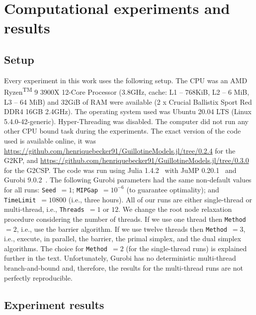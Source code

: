 \documentclass[9pt]{entcs}
\begin{document}
\section{Computational experiments and results}

\subsection{Setup}
\label{sec:setup}

Every experiment in this work uses the following setup.
The CPU was an AMD\textsuperscript{\textregistered} Ryzen\textsuperscript{TM} 9 3900X 12-Core Processor (3.8GHz, cache: L1 -- 768KiB, L2 -- 6 MiB, L3 -- 64 MiB) and 32GiB of RAM were available (2 x Crucial Ballistix Sport Red DDR4 16GB 2.4GHz).
The operating system used was Ubuntu 20.04 LTS (Linux 5.4.0-42-generic).
Hyper-Threading was disabled.
The computer did not run any other CPU bound task during the experiments.
The exact version of the code used is available online, it was \url{https://github.com/henriquebecker91/GuillotineModels.jl/tree/0.2.4} for the G2KP, and \url{https://github.com/henriquebecker91/GuillotineModels.jl/tree/0.3.0} for the G2CSP.
The code was run using Julia 1.4.2~\cite{julia} with JuMP 0.20.1~\cite{JuMP} and Gurobi 9.0.2~\cite{gurobi}.
The following Gurobi parameters had the same non-default values for all runs: \verb+Seed+~\(= 1\); \verb+MIPGap+~\(= 10^{-6}\) (to guarantee optimality); and \verb+TimeLimit+~\(= 10800\) (i.e., three hours).
All of our runs are either single-thread or multi-thread, i.e., \verb+Threads+~\(= 1\) or \(12\).
We change the root node relaxation procedure considering the number of threads.
If we use one thread then \verb+Method+~\(= 2\), i.e., use the barrier algorithm.
If we use twelve threads then \verb+Method+~\(= 3\), i.e., execute, in parallel, the barrier, the primal simplex, and the dual simplex algorithms.
The choice for \verb+Method+~\(= 2\) (for the single-thread runs) is explained further in the text.
Unfortunately, Gurobi has no deterministic multi-thread branch-and-bound and, therefore, the results for the multi-thread runs are not perfectly reproducible.

\subsection{Experiment results}
\end{document}
